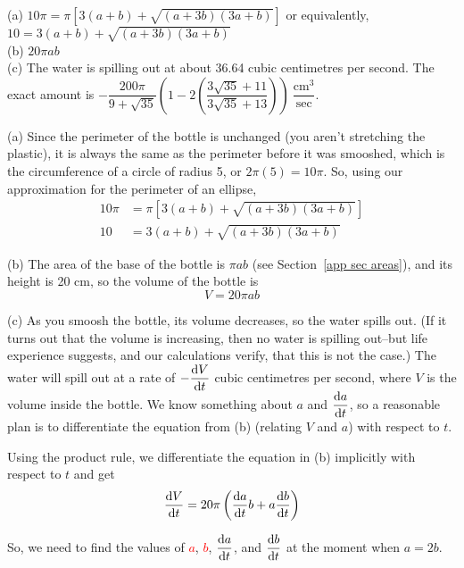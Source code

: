 \begin{answer}
(a)  $10\pi=\pi\left[3(a+b)+\sqrt{(a+3b)(3a+b)}\right]$ or equivalently,
$10=3(a+b)+\sqrt{(a+3b)(3a+b)}
$\\
(b) $20\pi a b$\\
(c) The water is spilling out at about
36.64 cubic centimetres per second. The exact amount is
 $-\dfrac{200\pi}{9+\sqrt{35}}\left(1-2\left(\dfrac{3\sqrt{35}+11}{3\sqrt{35}+13}\right)\right)~\dfrac{\mathrm{cm}^3}{\mathrm{sec}}$.
\end{answer}
\begin{solution}
(a) Since the perimeter of the bottle is unchanged (you aren't stretching the plastic), it is always the same as the perimeter before it was smooshed, which is the circumference of a circle of radius 5, or $2\pi(5)=10\pi$. So, using our approximation for the perimeter of an ellipse,
\begin{align*}
10\pi&=\pi\left[3(a+b)+\sqrt{(a+3b)(3a+b)}\right]\\
10&=3(a+b)+\sqrt{(a+3b)(3a+b)}
\end{align*}

(b) The area of the base of the bottle is $\pi a b$
(see Section~\ref*{app sec areas}), and its height is 20 cm, so the volume of the bottle is
\[V=20\pi a b\]

(c) As you smoosh the bottle, its volume decreases, so the water spills out. (If it turns out that the volume is increasing, then no water is spilling out--but life experience suggests, and our calculations verify, that this is not the case.)
The water will spill out at a rate of $-\ds\diff{V}{t}$ cubic centimetres per second, where $V$ is the volume inside the bottle. We know something about $a$ and $\ds\diff{a}{t}$, so a reasonable plan is to differentiate the equation from (b) (relating $V$ and $a$) with respect to $t$.

Using the product rule, we differentiate the equation in (b) implicitly with respect to $t$ and get
\[\diff{V}{t}=20\pi\left(\diff{a}{t}b+a\diff{b}{t}\right)\]

So, we need to find the values of \textcolor{red}{$a$}, \textcolor{red}{$b$},
\textcolor{red}{$\ds\diff{a}{t}$}, and \textcolor{red}{$\ds\diff{b}{t}$} at the moment when $a=2b$.


\end{solution}
